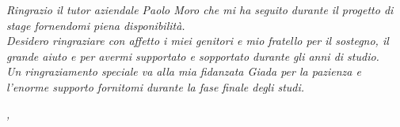 \noindent \textit{Ringrazio il tutor aziendale Paolo Moro che mi ha seguito durante il progetto di stage fornendomi piena disponibilità.}\\

\noindent \textit{Desidero ringraziare con affetto i miei genitori e mio fratello per il sostegno, il grande aiuto e per avermi supportato e sopportato durante gli anni di studio.}\\

\noindent \textit{Un ringraziamento speciale va alla mia fidanzata Giada per la pazienza e l'enorme supporto fornitomi durante la fase finale degli studi.}\\
\bigskip

\noindent\textit{\myLocation, \myTime}
\hfill \myName

\endgroup

